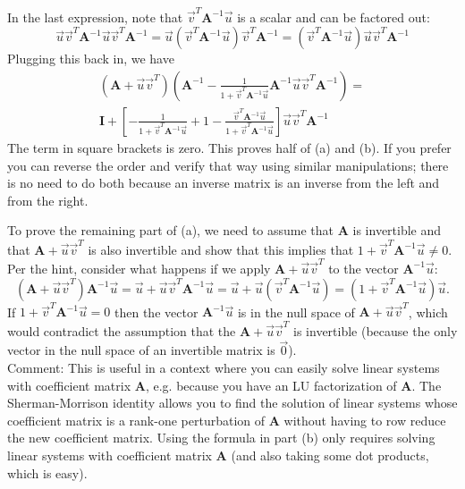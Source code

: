 \documentclass[11pt,fleqn]{article}
\newcommand{\mat}[1]{\mathbf{#1}}
\begin{document}
\begin{enumerate}
In the last expression, note that $\vec{v}^T\mathbf{A}^{-1}\vec{u}$ is a scalar and can be factored out:
\[\vec{u}\vec{v}^T\mat{A}^{-1}\vec{u}\vec{v}^T\mat{A}^{-1} = \vec{u}\left(\vec{v}^T\mathbf{A}^{-1}\vec{u}\right)\vec{v}^T\mathbf{A}^{-1}=\left(\vec{v}^T\mathbf{A}^{-1}\vec{u}\right)\vec{u}\vec{v}^T\mathbf{A}^{-1}\]
Plugging this back in, we have
\begin{multline*}
\left(\mathbf{A}+\vec{u}\vec{v}^T\right)\left(\mat{A}^{-1} - \frac{1}{1+\vec{v}^T\mathbf{A}^{-1}\vec{u}}\mat{A}^{-1}\vec{u}\vec{v}^T\mat{A}^{-1}\right) =\\ \mat{I} +\left[- \frac{1}{1 + \vec{v}^T\mathbf{A}^{-1}\vec{u}} + 1 - \frac{\vec{v}^T\mathbf{A}^{-1}\vec{u}}{1+\vec{v}^T\mathbf{A}^{-1}\vec{u}}\right]\vec{u}\vec{v}^T\mat{A}^{-1}
\end{multline*}
The term in square brackets is zero.
This proves half of (a) and (b).
If you prefer you can reverse the order and verify that way using similar manipulations; there is no need to do both because an inverse matrix is an inverse from the left and from the right.

To prove the remaining part of (a), we need to assume that $\mathbf{A}$ is invertible and that $\mathbf{A}+\vec{u}\vec{v}^T$ is also invertible and show that this implies that $1+\vec{v}^T\mathbf{A}^{-1}\vec{u}\neq0$.
Per the hint, consider what happens if we apply $\mathbf{A}+\vec{u}\vec{v}^T$ to the vector $\mathbf{A}^{-1}\vec{u}$:
\[\left(\mathbf{A}+\vec{u}\vec{v}^T\right)\mathbf{A}^{-1}\vec{u}=\vec{u} + \vec{u}\vec{v}^T\mathbf{A}^{-1}\vec{u} = \vec{u} + \vec{u}\left(\vec{v}^T\mathbf{A}^{-1}\vec{u}\right) = \left(1+\vec{v}^T\mathbf{A}^{-1}\vec{u}\right)\vec{u}.\]
If $1+\vec{v}^T\mathbf{A}^{-1}\vec{u}=0$ then the vector $\mathbf{A}^{-1}\vec{u}$ is in the null space of $\mathbf{A}+\vec{u}\vec{v}^T$, which would contradict the assumption that the $\mathbf{A} + \vec{u}\vec{v}^T$ is invertible (because the only vector in the null space of an invertible matrix is $\vec{0}$).\\

Comment: This is useful in a context where you can easily solve linear systems with coefficient matrix {\bf A}, e.g. because you have an LU factorization of {\bf A}. The Sherman-Morrison identity allows you to find the solution of linear systems whose coefficient matrix is a rank-one perturbation of {\bf A} without having to row reduce the new coefficient matrix. Using the formula in part (b) only requires solving linear systems with coefficient matrix {\bf A} (and also taking some dot products, which is easy).


\end{enumerate}
\end{document}
